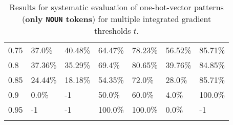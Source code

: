 \begin{table}[t]
\begin{tabular}{lllllll}
\multicolumn{1}{l|}{0.75}&  37.0\% & \multicolumn{1}{l|}{40.48\%}& 64.47\% & \multicolumn{1}{l|}{78.23\%}& 56.52\% & 85.71\%\\ 
\multicolumn{1}{l|}{0.8}&  37.36\% & \multicolumn{1}{l|}{35.29\%}& 69.4\% & \multicolumn{1}{l|}{80.65\%}& 39.76\% & 84.85\%\\ 
\multicolumn{1}{l|}{0.85}&  24.44\% & \multicolumn{1}{l|}{18.18\%}& 54.35\% & \multicolumn{1}{l|}{72.0\%}& 28.0\% & 85.71\%\\ 
\multicolumn{1}{l|}{0.9}&  0.0\% & \multicolumn{1}{l|}{-1}& 50.0\% & \multicolumn{1}{l|}{60.0\%}& 4.0\% & 100.0\%\\ 
\multicolumn{1}{l|}{0.95}&  -1 & \multicolumn{1}{l|}{-1}& 100.0\% & \multicolumn{1}{l|}{100.0\%}& 0.0\% & -1\\ 


\\ \hline
\end{tabular}
\caption[Model Evaluation for only \texttt{NOUN} tokens]{Results for systematic evaluation of one-hot-vector patterns (\textbf{only \texttt{NOUN} tokens}) for multiple integrated gradient thresholds $t$.}
\label{tab:evalResultsNOUN}
\end{table}
	